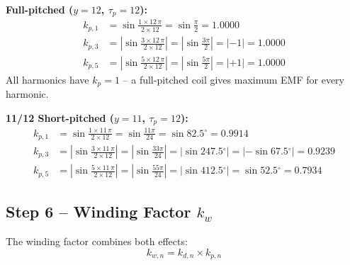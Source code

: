 \documentclass[12pt,a4paper]{article}
\newcommand{\degree}{\ensuremath{^{\circ}}}
\begin{document}
\textbf{Full-pitched ($y = 12$, $\tau_p = 12$):}
\begin{align}
  k_{p,1} &= \sin\!\frac{1 \times 12\,\pi}{2 \times 12} = \sin\frac{\pi}{2} = \mathbf{1.0000}\\
  k_{p,3} &= \left|\sin\!\frac{3 \times 12\,\pi}{2 \times 12}\right|
           = \left|\sin\frac{3\pi}{2}\right| = |-1| = \mathbf{1.0000}\\
  k_{p,5} &= \left|\sin\!\frac{5 \times 12\,\pi}{2 \times 12}\right|
           = \left|\sin\frac{5\pi}{2}\right| = |+1| = \mathbf{1.0000}
\end{align}
All harmonics have $k_p = 1$ -- a full-pitched coil gives maximum EMF for every harmonic.

\textbf{11/12 Short-pitched ($y = 11$, $\tau_p = 12$):}
\begin{align}
  k_{p,1} &= \sin\!\frac{1 \times 11\,\pi}{2 \times 12}
           = \sin\!\frac{11\pi}{24}
           = \sin 82.5\degree = \mathbf{0.9914}\\
  k_{p,3} &= \left|\sin\!\frac{3 \times 11\,\pi}{2 \times 12}\right|
           = \left|\sin\!\frac{33\pi}{24}\right|
           = \left|\sin 247.5\degree\right|
           = |-\sin 67.5\degree| = \mathbf{0.9239}\\
  k_{p,5} &= \left|\sin\!\frac{5 \times 11\,\pi}{2 \times 12}\right|
           = \left|\sin\!\frac{55\pi}{24}\right|
           = \left|\sin 412.5\degree\right|
           = \sin 52.5\degree = \mathbf{0.7934}
\end{align}

\subsection{Step 6 -- Winding Factor $k_w$}

The winding factor combines both effects:
\begin{equation}
  \boxed{k_{w,n} = k_{d,n} \times k_{p,n}}
  \label{eq:kw_q1}
\end{equation}
\end{document}
